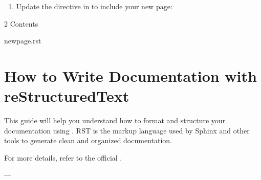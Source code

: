 \documentclass[a4paper,10pt,english]{sphinxmanual}
\begin{document}
\begin{enumerate}
\begin{enumerate}
\end{enumerate}

\begin{sphinxVerbatim}[commandchars=\\\{\}]

\end{sphinxVerbatim}
\begin{enumerate}
%
\setcounter{enumii}{2}
\item {} 
\sphinxAtStartPar
Update the  directive in  to include your new page:

\end{enumerate}

\begin{sphinxVerbatim}[commandchars=\\\{\}]
 
     2
     Contents

    new\PYGZus{}page.rst
\end{sphinxVerbatim}

\end{enumerate}

\sphinxstepscope


\section{How to Write Documentation with reStructuredText}
\label{\detokenize{page_two:how-to-write-documentation-with-restructuredtext}}\label{\detokenize{page_two::doc}}
\sphinxAtStartPar
This guide will help you understand how to format and structure your documentation using . RST is the markup language used by Sphinx and other tools to generate clean and organized documentation.

\sphinxAtStartPar
For more details, refer to the official .

\sphinxAtStartPar
—
\end{document}
